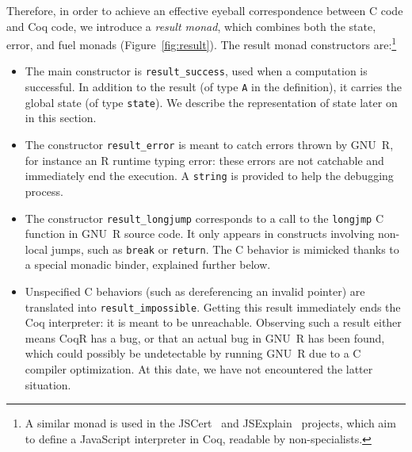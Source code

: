 \documentclass[
    sigplan,
    10pt,
    review, %
    natbib=false %
 ]{acmart}
\newcommand\CoqR{CoqR}
\newcommand\newtext[1]{{\color{blue} #1}}
\begin{document}
Therefore, in order to achieve an effective eyeball correspondence between C code and Coq code, we introduce a {\em result monad}, which combines both the state, error, and fuel monads (Figure~\ref{fig:result}).
%
The result monad constructors are:\footnote{A similar monad is used in the JSCert~\parencite{popl14jscert} and JSExplain~\parencite{JSExplain} projects, which aim to define a JavaScript interpreter in Coq, readable by non-specialists.
}
\begin{itemize}[leftmargin=0.5em]
\item The main constructor is \texttt{result_success}, used when a computation is successful.
In addition to the result (of type \texttt{A} in the definition),
it carries the global state (of type \texttt{state}). We describe the representation of state later on in this section.
%
\item The constructor \texttt{result_error} is meant to catch
errors thrown by GNU~R, for instance an R runtime typing error:
these errors are not catchable and immediately end the execution.
A \texttt{string} is provided to help the debugging process.
%
\item The constructor \texttt{result_longjump}
corresponds to a call to the \texttt{longjmp}
C function in GNU~R source code.
It only appears in constructs involving non-local jumps,
such as \texttt{break} or \texttt{return}.
\newtext{The C behavior is mimicked thanks to a special monadic binder, explained further below.}
%
\item Unspecified C behaviors
(such as dereferencing an invalid pointer)
are translated into
\texttt{result_impossible}.
Getting this result immediately ends the Coq interpreter:
it is meant to be unreachable.
Observing such a result either means \CoqR{} has a bug, or that an actual bug in GNU~R has been found, which could possibly be undetectable by running GNU~R due to a C compiler optimization. At this date, we have not encountered the latter situation.

\end{itemize}
\end{document}
